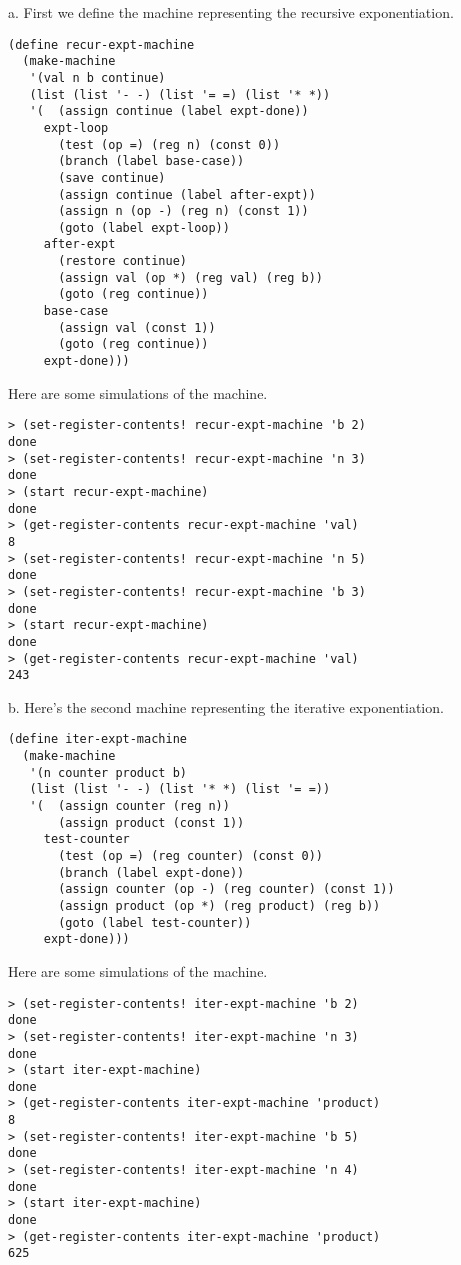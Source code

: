 \documentclass[a4paper,12pt]{article}
\newcommand{\subpar}[1]{\medskip \noindent #1.}
\begin{document}
\subpar{a} First we define the machine representing the recursive
exponentiation.
\begin{lstlisting}
(define recur-expt-machine
  (make-machine
   '(val n b continue)
   (list (list '- -) (list '= =) (list '* *))
   '(  (assign continue (label expt-done))
     expt-loop
       (test (op =) (reg n) (const 0))
       (branch (label base-case))
       (save continue)
       (assign continue (label after-expt))
       (assign n (op -) (reg n) (const 1))
       (goto (label expt-loop))
     after-expt
       (restore continue)
       (assign val (op *) (reg val) (reg b))
       (goto (reg continue))
     base-case
       (assign val (const 1))
       (goto (reg continue))
     expt-done)))
\end{lstlisting}

Here are some simulations of the machine.

\begin{lstlisting}
> (set-register-contents! recur-expt-machine 'b 2)
done
> (set-register-contents! recur-expt-machine 'n 3)
done
> (start recur-expt-machine)
done
> (get-register-contents recur-expt-machine 'val)
8
> (set-register-contents! recur-expt-machine 'n 5)
done
> (set-register-contents! recur-expt-machine 'b 3)
done
> (start recur-expt-machine)
done
> (get-register-contents recur-expt-machine 'val)
243
\end{lstlisting}

\subpar{b} Here's the second machine representing the iterative
exponentiation.
\begin{lstlisting}
(define iter-expt-machine
  (make-machine
   '(n counter product b)
   (list (list '- -) (list '* *) (list '= =))
   '(  (assign counter (reg n))
       (assign product (const 1))
     test-counter
       (test (op =) (reg counter) (const 0))
       (branch (label expt-done))
       (assign counter (op -) (reg counter) (const 1))
       (assign product (op *) (reg product) (reg b))
       (goto (label test-counter))
     expt-done)))
\end{lstlisting}
Here are some simulations of the machine.
\begin{lstlisting}
> (set-register-contents! iter-expt-machine 'b 2)
done
> (set-register-contents! iter-expt-machine 'n 3)
done
> (start iter-expt-machine)
done
> (get-register-contents iter-expt-machine 'product)
8
> (set-register-contents! iter-expt-machine 'b 5)
done
> (set-register-contents! iter-expt-machine 'n 4)
done
> (start iter-expt-machine)
done
> (get-register-contents iter-expt-machine 'product)
625
\end{lstlisting}
\end{document}
